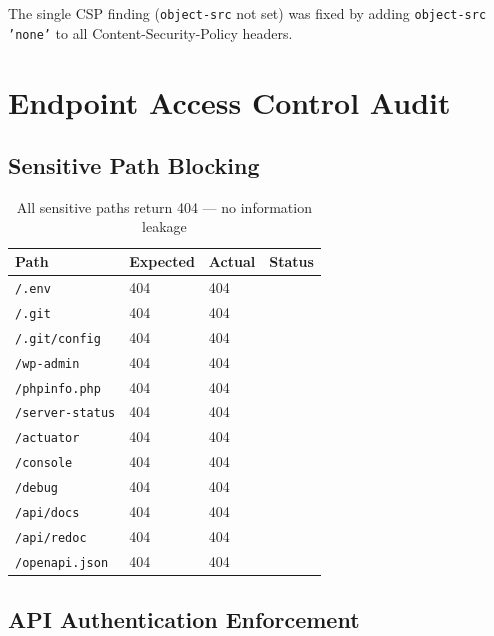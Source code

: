 \documentclass[12pt,a4paper]{article}
\newcommand{\pass}{\textcolor{success}{\checkmark}}
\begin{document}
The single CSP finding (\texttt{object-src} not set) was fixed by adding \texttt{object-src 'none'} to all Content-Security-Policy headers.

\section{Endpoint Access Control Audit}

\subsection{Sensitive Path Blocking}

\begin{table}[H]
\centering
\begin{tabular}{lllc}
\toprule
\textbf{Path} & \textbf{Expected} & \textbf{Actual} & \textbf{Status} \\
\midrule
\texttt{/.env} & 404 & 404 & \pass \\
\texttt{/.git} & 404 & 404 & \pass \\
\texttt{/.git/config} & 404 & 404 & \pass \\
\texttt{/wp-admin} & 404 & 404 & \pass \\
\texttt{/phpinfo.php} & 404 & 404 & \pass \\
\texttt{/server-status} & 404 & 404 & \pass \\
\texttt{/actuator} & 404 & 404 & \pass \\
\texttt{/console} & 404 & 404 & \pass \\
\texttt{/debug} & 404 & 404 & \pass \\
\texttt{/api/docs} & 404 & 404 & \pass \\
\texttt{/api/redoc} & 404 & 404 & \pass \\
\texttt{/openapi.json} & 404 & 404 & \pass \\
\bottomrule
\end{tabular}
\caption{All sensitive paths return 404 --- no information leakage}
\end{table}

\subsection{API Authentication Enforcement}
\end{document}
